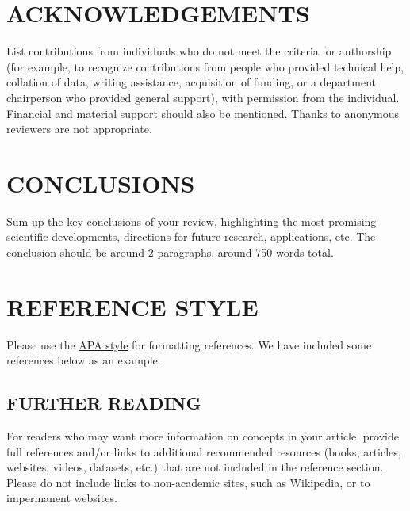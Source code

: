 \documentclass[12pt]{article}
\begin{document}
\section*{\sffamily \Large ACKNOWLEDGEMENTS}
List contributions from individuals who do not meet the criteria for authorship (for example, to recognize contributions from people who provided technical help, collation of data, writing assistance, acquisition of funding, or a department chairperson who provided general support), with permission from the individual. Financial and material support should also be mentioned. Thanks to anonymous reviewers are not appropriate.


\section*{\sffamily \Large CONCLUSIONS}

Sum up the key conclusions of your review, highlighting the most promising scientific developments, directions for future research, applications, etc. The conclusion should be around 2 paragraphs, around 750 words total.

\section*{\sffamily \Large REFERENCE STYLE}
  Please use the \href{http://www.apastyle.org/learn/quick-guide-on-references.aspx}{APA style} for formatting references.  We have included some references below as an example.


\nocite{coulson1960present}
\nocite{hoffmann2008predicting}
\nocite{koros1987separation}
\nocite{malrieu1998quantum}
\nocite{perdew2009some}
\nocite{shaik2007my}


\subsection*{\sffamily \Large FURTHER READING}
For readers who may want more information on concepts in your article, provide full references and/or links to additional recommended resources (books, articles, websites, videos, datasets, etc.) that are not included in the reference section. Please do not include links to non-academic sites, such as Wikipedia, or to impermanent websites.
\end{document}
